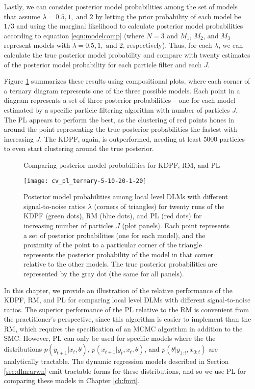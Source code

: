 Lastly, we can consider posterior model probabilities among the set of models that assume $\lambda = 0.5, 1, \mbox{ and } 2$ by letting the prior probability of each model be $1/3$ and using the marginal likelihood to calculate posterior model probabilities according to equation \eqref{eqn:modelcomp} (where $N = 3$ and $M_1$, $M_2$, and $M_3$ represent models with $\lambda = 0.5, 1, \mbox{ and } 2$, respectively). Thus, for each $\lambda$, we can calculate the true posterior model probability and compare with twenty estimates of the posterior model probability for each particle filter and each $J$.

Figure \ref{fig:comp:post} summarizes these results using compositional plots, where each corner of a ternary diagram represents one of the three possible models. Each point in a diagram represents a set of three posterior probabilities -- one for each model -- estimated by a specific particle filtering algorithm with number of particles $J$. The PL appears to perform the best, as the clustering of red points hones in around the point representing the true posterior probabilities the fastest with increasing $J$. The KDPF, again, is outperformed, needing at least 5000 particles to even start clustering around the true posterior.

\begin{figure}[ht]
\ssp
\centering
\caption{Comparing posterior model probabilities for KDPF, RM, and PL} \label{fig:comp:post}
\texttt{[image: cv\_pl\_ternary-5-10-20-1-20]}
\caption*{Posterior model probabilities among local level DLMs with different signal-to-noise ratios $\lambda$ (corners of triangles) for twenty runs of the KDPF (green dots), RM (blue dots), and PL (red dots) for increasing number of particles $J$ (plot panels). Each point represents a set of posterior probabilities (one for each model), and the proximity of the point to a particular corner of the triangle represents the posterior probability of the model in that corner relative to the other models. The true posterior probabilities are represented by the gray dot (the same for all panels).}
\end{figure}

In this chapter, we provide an illustration of the relative performance of the KDPF, RM, and PL for comparing local level DLMs with different signal-to-noise ratios. The superior performance of the PL relative to the RM is convenient from the practitioner's perspective, since this algorithm is easier to implement than the RM, which requires the specification of an MCMC algorithm in addition to the SMC. However, PL can only be used for specific models where the the distributions $p(y_{t+1}|x_t,\theta)$, $p(x_{t+1}|y_t,x_t,\theta)$, and $p(\theta|y_{1:t},x_{0:t})$ are analytically tractable. The dynamic regression models described in Section \ref{sec:dlm:arwn} emit tractable forms for these distributions, and so we use PL for comparing these models in Chapter \ref{ch:fmri}. 